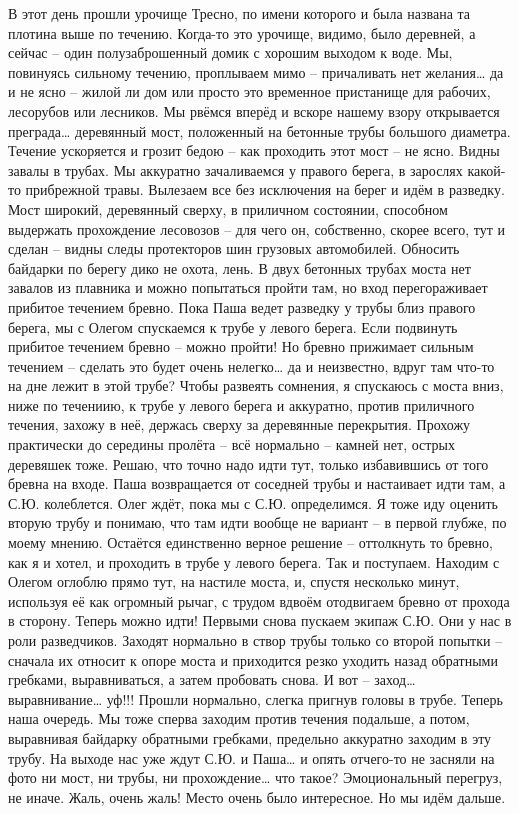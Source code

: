 В этот день прошли урочище Тресно, по имени которого и была названа та плотина выше по течению. Когда-то это урочище, видимо, было деревней, а сейчас – один полузаброшенный домик с хорошим выходом к воде. Мы, повинуясь сильному течению, проплываем мимо – причаливать нет желания… да и не ясно – жилой ли дом или просто это временное пристанище для рабочих, лесорубов или лесников.
Мы рвёмся вперёд и вскоре нашему взору открывается преграда… деревянный мост, положенный на бетонные трубы большого диаметра. Течение ускоряется и грозит бедою – как проходить этот мост – не ясно. Видны завалы в трубах. Мы аккуратно зачаливаемся у правого берега, в зарослях какой-то прибрежной травы. Вылезаем все без исключения на берег и идём в разведку. Мост широкий, деревянный сверху, в приличном состоянии, способном выдержать прохождение лесовозов – для чего он, собственно, скорее всего, тут и сделан – видны следы протекторов шин грузовых автомобилей. Обносить байдарки по берегу дико не охота, лень. В двух бетонных трубах моста нет завалов из плавника и можно попытаться пройти там, но вход перегораживает прибитое течением бревно. Пока Паша ведет разведку у трубы близ правого берега, мы с Олегом спускаемся к трубе у левого берега. Если подвинуть прибитое течением бревно – можно пройти! Но бревно прижимает сильным течением – сделать это будет очень нелегко… да и неизвестно, вдруг там что-то на дне лежит в этой трубе? Чтобы развеять сомнения, я спускаюсь с моста вниз, ниже по течениию, к трубе у левого берега и аккуратно, против приличного течения, захожу в неё, держась сверху за деревянные перекрытия. Прохожу практически до середины пролёта – всё нормально – камней нет, острых деревяшек тоже. Решаю, что точно надо идти тут, только избавившись от того бревна на входе.
Паша возвращается от соседней трубы и настаивает идти там, а С.Ю. колеблется. Олег ждёт, пока мы с С.Ю. определимся. Я тоже иду оценить вторую трубу и понимаю, что там идти вообще не вариант – в первой глубже, по моему мнению. Остаётся единственно верное решение – оттолкнуть то бревно, как я и хотел, и проходить в трубе у левого берега. Так и поступаем. Находим с Олегом оглоблю прямо тут, на настиле моста, и, спустя несколько минут, используя её как огромный рычаг, с трудом вдвоём отодвигаем бревно от прохода в сторону. Теперь можно идти! 
Первыми снова пускаем экипаж С.Ю. Они у нас в роли разведчиков. Заходят нормально в створ трубы только со второй попытки – сначала их относит к опоре моста и приходится резко уходить назад обратными гребками, выравниваться, а затем пробовать снова. И вот – заход… выравнивание… уф!!! Прошли нормально, слегка пригнув головы в трубе. Теперь наша очередь. Мы тоже сперва заходим против течения подальше, а потом, выравнивая байдарку обратными гребками, предельно аккуратно заходим в эту трубу. На выходе нас уже ждут С.Ю. и Паша… и опять отчего-то не засняли на фото ни мост, ни трубы, ни прохождение… что такое? Эмоциональный перегруз, не иначе. Жаль, очень жаль! Место очень было интересное. Но мы идём дальше.
